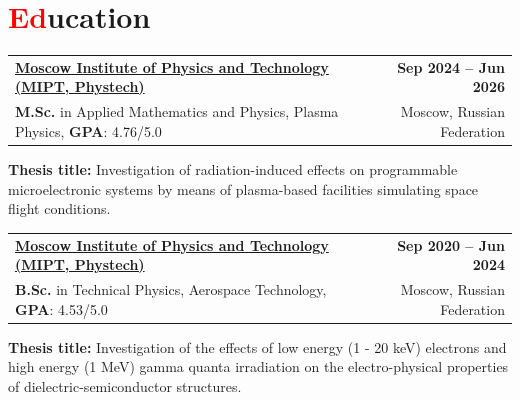 \documentclass[a4paper,11pt]{article}
\makeatletter
\newcommand{\resumesection}[2]{\section{\textcolor{red}{#1}#2}}
\newcommand{\resumeSubHeadingListStart}{\begin{itemize}[leftmargin=0.0in, label={}, itemsep=2pt]}
\newcommand{\resumeSubHeadingListEnd}{\end{itemize}}
\newcommand{\resumeItem}[1]{
    \item\small{#1}
}
\newcommand{\resumeSubheading}[4]{
    \item
    \begin{tabular*}{1.0\textwidth}[t]{l@{\extracolsep{\fill}}r}
        \textbf{#1} & \textbf{\small #2} \\
        \small#3 & \small #4
    \end{tabular*}
}
\makeatother
\begin{document}
{\setlength{\tabcolsep}{0pt}
\resumesection{Ed}{ucation}

\resumeSubHeadingListStart
    \resumeSubheading
        {\href{https://mipt.ru/}{Moscow Institute of Physics and Technology (MIPT, Phystech)}}{Sep 2024 -- Jun 2026}
        {\textbf{M.Sc.} in Applied Mathematics and Physics, Plasma Physics, \textbf{GPA}: 4.76/5.0}{Moscow, Russian Federation}
        {\resumeItem{\textbf{Thesis title:} Investigation of radiation-induced effects on programmable microelectronic systems by means of plasma-based facilities simulating space flight conditions.}}
    \resumeSubheading
        {\href{https://mipt.ru/}{Moscow Institute of Physics and Technology (MIPT, Phystech)}}{Sep 2020 -- Jun 2024}
        {\textbf{B.Sc.} in Technical Physics, Aerospace Technology, \textbf{GPA}: 4.53/5.0}{Moscow, Russian Federation}
        {\resumeItem{\textbf{Thesis title:} Investigation of the effects of low energy (1 - 20 keV) electrons and high energy (1 MeV) gamma quanta irradiation on the electro-physical properties of dielectric-semiconductor structures.}}
\resumeSubHeadingListEnd

}
\end{document}
